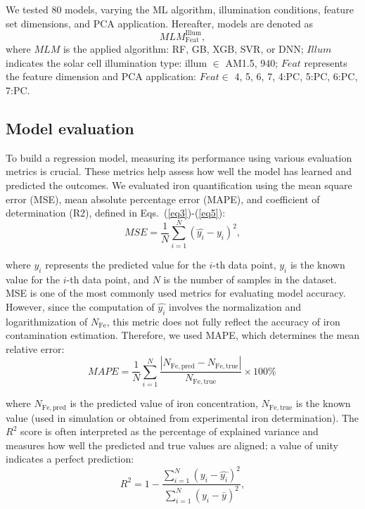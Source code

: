 \documentclass[a4paper,fleqn]{cas-sc}
\begin{document}
We tested 80 models, varying the ML algorithm, illumination conditions, feature set dimensions, and PCA application. 
Hereafter, models are denoted as
\begin{equation}
\label{eq2}
    MLM^\mathrm{Illum}_\mathrm{Feat},
\end{equation}
where $MLM$ is the applied algorithm: RF, GB, XGB, SVR, or DNN; $Illum$ indicates the solar cell illumination type: illum $\in$ {AM1.5, 940}; $Feat$ represents the feature dimension and PCA application: $Feat \in$ {4, 5, 6, 7, 4:PC, 5:PC, 6:PC, 7:PC}.

\subsection{Model evaluation}
\par
To build a regression model, measuring its performance using various evaluation metrics is crucial. 
These metrics help assess how well the model has learned and predicted the outcomes. 
We evaluated iron quantification using the mean square error (MSE), mean absolute percentage error (MAPE), and coefficient of determination (R2), defined in Eqs.~(\ref{eq3})-(\ref{eq5}):
\begin{equation}
\label{eq3}
    MSE = \frac{1}{N}\displaystyle\sum_{i=1}^{N} (\hat{y_i}-y_i)^2,
\end{equation}


where $\hat{y_i}$ represents the predicted value for the $i$-th data point, $y_i$ is the known value for the $i$-th data point, and $N$ is the number of samples in the dataset. 
MSE is one of the most commonly used metrics for evaluating model accuracy. 
However, since the computation of $\hat{y_i}$ involves the normalization and logarithmization of $N_\mathrm{Fe}$, this metric does not fully reflect the accuracy of iron contamination estimation. 
Therefore, we used MAPE, which determines the mean relative error:
\begin{equation}
\label{eq4}
    MAPE = \frac{1}{N}\displaystyle\sum_{i=1}^{N} \frac{|N_\mathrm{Fe,pred}-N_\mathrm{Fe,true}|}{N_\mathrm{Fe,true}}\times 100 \%\,
\end{equation}


where $N_\mathrm{Fe,pred}$ is the predicted value of iron concentration, $N_\mathrm{Fe,true}$ is the known value (used in simulation or obtained from experimental iron determination). 
The $R^2$ score is often interpreted as the percentage of explained variance and measures how well the predicted and true values are aligned; a value of unity indicates a perfect prediction:
\begin{equation}
\label{eq5}
    R^2 = 1-\frac{\displaystyle\sum_{i=1}^{N} (y_i-\hat{y_i})^2}{\displaystyle\sum_{i=1}^{N} (y_i-\bar{y})^2},
\end{equation}
\end{document}
